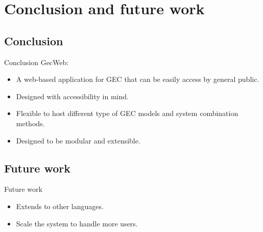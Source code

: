 \section{Conclusion and future work}

\subsection{Conclusion}
\begin{frame}{Conclusion}
  GecWeb:

  \begin{itemize}
    \item A web-based application for GEC that can be easily access by general public.
    \item Designed with accessibility in mind.
    \item Flexible to host different type of GEC models and system combination methods.
    \item Designed to be modular and extensible.
  \end{itemize}
\end{frame}

\subsection{Future work}
\begin{frame}{Future work}
  \begin{itemize}
    \item Extends to other languages.
    \item Scale the system to handle more users.
  \end{itemize}
\end{frame}
